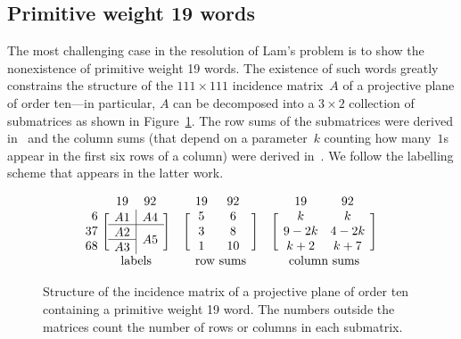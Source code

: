 \documentclass[letterpaper]{article}
\begin{document}
\subsection{Primitive weight 19 words}

The most challenging case in the resolution of Lam's problem is to
show the nonexistence of primitive weight 19 words.  The existence
of such words greatly constrains the structure of the $111\times111$ incidence matrix~$A$
of a projective plane of order ten---in particular, $A$ can be decomposed
into a $3\times2$ collection of submatrices as shown in Figure~\ref{fig:structure}.
The row sums of the submatrices were derived in~\cite{carter1974existence}
and the column sums (that depend on a parameter~$k$ counting how many~$1$s appear
in the first six rows of a column) were derived in~\cite{lam1985estimates}.
We follow the labelling scheme that appears in the latter work.

\begin{figure}
\[
\begin{matrix}
& & 19 & 92 \\
\phantom{0}6\!\!\!\! & \multirow{3}{*}{\rlap{$\left[\rule{0pt}{16pt}\right.$}} & \multicolumn{1}{c|}{\raisebox{-1pt}{$A1$}} & \raisebox{-1pt}{$A4$} & \multirow{3}{*}{\llap{$\left.\rule{0pt}{16pt}\right]$}} \\ \cline{3-4}
37\!\!\!\! & & \multicolumn{1}{c|}{\raisebox{-1pt}{$A2$}} & \multirow{2}{*}{\raisebox{-1pt}{$A5$}} \\ \cline{3-3}
68\!\!\!\! & & \multicolumn{1}{c|}{\raisebox{-1pt}{$A3$}} & \\
& & \multicolumn{2}{c}{\text{labels}\rule{0pt}{8pt}}
\end{matrix}
\quad
\begin{matrix}
& 19 & 92 \\
\multirow{3}{*}{\rlap{$\left[\rule{0pt}{16pt}\right.$}} & 5 & 6 & \multirow{3}{*}{\llap{$\left.\rule{0pt}{16pt}\right]$}} \\
& 3 & 8 \\
& 1 & 10 \\
& \multicolumn{2}{c}{\text{row sums}\rule{0pt}{8pt}}
\end{matrix}
\quad
\begin{matrix}
& 19 & 92 \\
\multirow{3}{*}{\rlap{$\left[\rule{0pt}{16pt}\right.$}} & k & k & \multirow{3}{*}{\llap{$\left.\rule{0pt}{16pt}\right]$}} \\
& 9-2k & 4-2k \\
& k+2 & k+7 \\
& \multicolumn{2}{c}{\text{column sums}\rule{0pt}{8pt}}
\end{matrix}
\]
\caption{Structure of the incidence matrix of a projective plane of order ten
containing a primitive weight 19 word.  The numbers outside the matrices count
the number of rows or columns in each submatrix.
}\label{fig:structure}
\end{figure}
\end{document}
